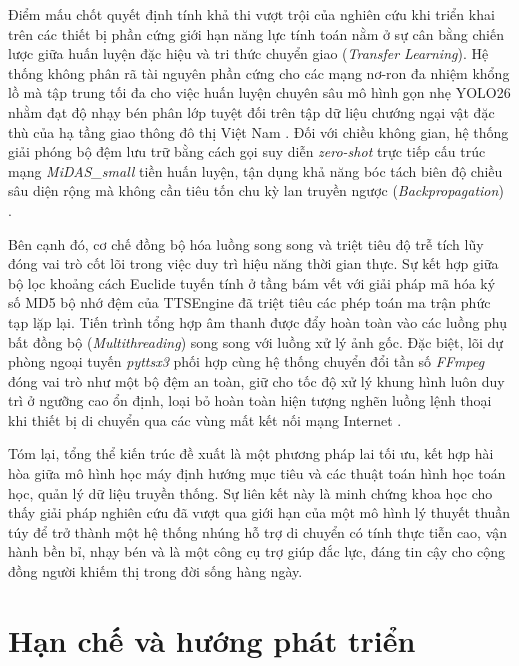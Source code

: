 Điểm mấu chốt quyết định tính khả thi vượt trội của nghiên cứu khi triển khai trên các thiết bị phần cứng giới hạn năng lực tính toán nằm ở sự cân bằng chiến lược giữa huấn luyện đặc hiệu và tri thức chuyển giao (\textit{Transfer Learning}). Hệ thống không phân rã tài nguyên phần cứng cho các mạng nơ-ron đa nhiệm khổng lồ mà tập trung tối đa cho việc huấn luyện chuyên sâu mô hình gọn nhẹ YOLO26 nhằm đạt độ nhạy bén phân lớp tuyệt đối trên tập dữ liệu chướng ngại vật đặc thù của hạ tầng giao thông đô thị Việt Nam \cite{Reference3}. Đối với chiều không gian, hệ thống giải phóng bộ đệm lưu trữ bằng cách gọi suy diễn \textit{zero-shot} trực tiếp cấu trúc mạng \textit{MiDAS\_small} tiền huấn luyện, tận dụng khả năng bóc tách biên độ chiều sâu diện rộng mà không cần tiêu tốn chu kỳ lan truyền ngược (\textit{Backpropagation}) \cite{Reference11}.

Bên cạnh đó, cơ chế đồng bộ hóa luồng song song và triệt tiêu độ trễ tích lũy đóng vai trò cốt lõi trong việc duy trì hiệu năng thời gian thực. Sự kết hợp giữa bộ lọc khoảng cách Euclide tuyến tính ở tầng bám vết với giải pháp mã hóa ký số MD5 bộ nhớ đệm của TTSEngine đã triệt tiêu các phép toán ma trận phức tạp lặp lại. Tiến trình tổng hợp âm thanh được đẩy hoàn toàn vào các luồng phụ bất đồng bộ (\textit{Multithreading}) song song với luồng xử lý ảnh gốc. Đặc biệt, lõi dự phòng ngoại tuyến \textit{pyttsx3} phối hợp cùng hệ thống chuyển đổi tần số \textit{FFmpeg} đóng vai trò như một bộ đệm an toàn, giữ cho tốc độ xử lý khung hình luôn duy trì ở ngưỡng cao ổn định, loại bỏ hoàn toàn hiện tượng nghẽn luồng lệnh thoại khi thiết bị di chuyển qua các vùng mất kết nối mạng Internet \cite{Reference13}.

Tóm lại, tổng thể kiến trúc đề xuất là một phương pháp lai tối ưu, kết hợp hài hòa giữa mô hình học máy định hướng mục tiêu và các thuật toán hình học toán học, quản lý dữ liệu truyền thống. Sự liên kết này là minh chứng khoa học cho thấy giải pháp nghiên cứu đã vượt qua giới hạn của một mô hình lý thuyết thuần túy để trở thành một hệ thống nhúng hỗ trợ di chuyển có tính thực tiễn cao, vận hành bền bỉ, nhạy bén và là một công cụ trợ giúp đắc lực, đáng tin cậy cho cộng đồng người khiếm thị trong đời sống hàng ngày.

\section{Hạn chế và hướng phát triển}
 
